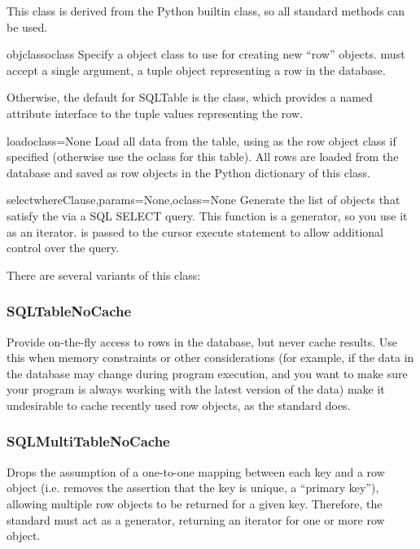 \documentclass{howto}
\begin{document}
This class is derived from
the Python builtin  class, so all standard methods 
can be used.

\begin{funcdesc}{objclass}{oclass}
  Specify a object class to use for creating new ``row'' objects.
   must accept a single argument, a tuple object representing
  a row in the database.  

  Otherwise, the default  for SQLTable is
  the  class, which provides a named attribute interface
  to the tuple values representing the row.
\end{funcdesc}

\begin{funcdesc}{load}{oclass=None}
  Load all data from the table, using  as the row object
  class if specified (otherwise use the oclass for this table).
  All rows are loaded from the database and saved as row objects
  in the Python dictionary of this class.
\end{funcdesc}

\begin{funcdesc}{select}{whereClause,params=None,oclass=None}
  Generate the list of objects that satisfy the 
  via a SQL SELECT query.  This function is a generator, so you
  use it as an iterator.   is passed to the
  cursor execute statement to allow additional control over
  the query.
\end{funcdesc}

There are several variants of this class:
\subsubsection{SQLTableNoCache}
Provide on-the-fly access to rows in the database, 
but never cache results.  Use this when memory constraints or other 
considerations (for example, if the data in the database may change
during program execution, and you want to make sure your program
is always working with the latest version of the data) 
make it undesirable to cache recently used row objects, as the
standard  does.

\subsubsection{SQLMultiTableNoCache}
Drops the assumption of a one-to-one
mapping between each key and a row object (i.e. removes the
assertion that the key is unique, a ``primary key''), allowing
multiple row objects to be returned for a given key.  Therefore,
the standard  must act as a generator, returning
an iterator for one or more row object.
\end{document}
